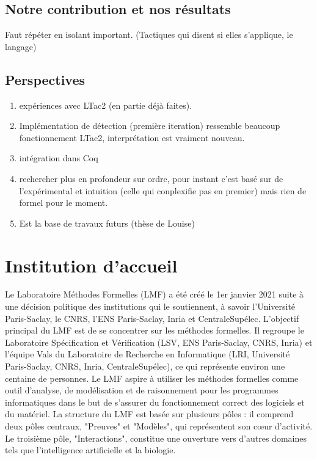 \documentclass[titlepage]{article}
\begin{document}
\subsection{Notre contribution et nos résultats}
Faut répéter en isolant important. (Tactiques qui disent si elles s'applique, le langage)
\subsection{Perspectives}
\begin{enumerate}
    \item expériences avec LTac2 (en partie déjà faites).
    \item Implémentation de détection (première iteration) ressemble beaucoup fonctionnement LTac2, interprétation est vraiment nouveau.
    \item intégration dans Coq
    \item rechercher plus en profondeur sur ordre, pour instant c'est basé sur de l'expérimental et intuition (celle qui conplexifie pas en premier) mais rien de formel pour le moment.
    \item Est la base de travaux futurs (thèse de Louise)
\end{enumerate}















\newpage
\appendix
\section{Institution d'accueil}
Le Laboratoire Méthodes Formelles (LMF) a été créé le 1er janvier 2021 suite à une décision politique des institutions qui le soutiennent, à savoir l'Université Paris-Saclay, le CNRS, l'ENS Paris-Saclay, Inria et CentraleSupélec. L'objectif principal du LMF est de se concentrer sur les méthodes formelles. Il regroupe le Laboratoire Spécification et Vérification (LSV, ENS Paris-Saclay, CNRS, Inria) et l'équipe Vals du Laboratoire de Recherche en Informatique (LRI, Université Paris-Saclay, CNRS, Inria, CentraleSupélec), ce qui représente environ une centaine de personnes.
Le LMF aspire à utiliser les méthodes formelles comme outil d'analyse, de modélisation et de raisonnement pour les programmes informatiques dans le but de s'assurer du fonctionnement correct des logiciels et du matériel.
La structure du LMF est basée sur plusieurs pôles : il comprend deux pôles centraux, "Preuves" et "Modèles", qui représentent son cœur d'activité. Le troisième pôle, "Interactions", constitue une ouverture vers d'autres domaines tels que l'intelligence artificielle et la biologie.



\end{document}
